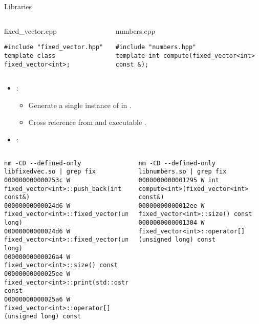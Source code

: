 \begin{frame}[t,fragile]{Libraries}
\begin{columns}[T]

\begin{block}{fixed\_vector.cpp}
\begin{lstlisting}[basicstyle=\mode<presentation>{\tiny}]
#include "fixed_vector.hpp"
template class fixed_vector<int>;
\end{lstlisting}
\end{block}

\begin{block}{numbers.cpp}
\begin{lstlisting}[basicstyle=\mode<presentation>{\tiny}]
#include "numbers.hpp"
template int compute(fixed_vector<int> const &);
\end{lstlisting}
\end{block}
\end{columns}

\begin{itemize}
  \item {}: 
    \begin{itemize}
      \item Generate a single instance of 
            in .
      \item Cross reference from  and executable .
    \end{itemize}

  \item {}:
\end{itemize}

\begin{columns}[T]

\begin{lstlisting}[style=terminal=escapechar=@,basicstyle=\mode<presentation>{\tiny}]
nm -CD --defined-only libfixedvec.so | grep fix
000000000000253c W fixed_vector<int>::push_back(int const&)
00000000000024d6 W fixed_vector<int>::fixed_vector(unsigned long)
00000000000024d6 W fixed_vector<int>::fixed_vector(unsigned long)
00000000000026a4 W fixed_vector<int>::size() const
00000000000025ee W fixed_vector<int>::print(std::ostream&) const
00000000000025a6 W fixed_vector<int>::operator[](unsigned long) const
\end{lstlisting}

\begin{lstlisting}[style=terminal=escapechar=@,basicstyle=\mode<presentation>{\tiny}]
nm -CD --defined-only libnumbers.so | grep fix
0000000000001295 W int compute<int>(fixed_vector<int> const&)
00000000000012ee W fixed_vector<int>::size() const
0000000000001304 W fixed_vector<int>::operator[](unsigned long) const
\end{lstlisting}
\end{columns}
\end{frame}

